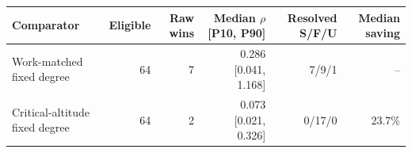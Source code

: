 \begin{tabular}{@{}lrrrrr@{}}
\toprule
Comparator & Eligible & Raw wins & Median $\rho$ [P10, P90] &
Resolved S/F/U & Median saving \\
\midrule
Work-matched fixed degree &
64 &
7 &
0.286
[0.041,
 1.168] &
7/9/1 & -- \\
Critical-altitude fixed degree &
64 &
2 &
0.073
[0.021,
 0.326] &
0/17/0 & 23.7\% \\
\bottomrule
\end{tabular}
